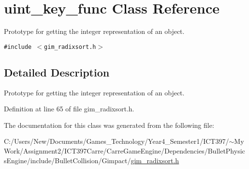 \hypertarget{classuint__key__func}{
\section{uint\_\-key\_\-func Class Reference}
\label{classuint__key__func}
}
Prototype for getting the integer representation of an object.  


{\tt \#include $<$gim\_\-radixsort.h$>$}



\subsection{Detailed Description}
Prototype for getting the integer representation of an object. 

Definition at line 65 of file gim\_\-radixsort.h.

The documentation for this class was generated from the following file:\begin{CompactItemize}
\item 
C:/Users/New/Documents/Games\_\-Technology/Year4\_\-Semester1/ICT397/$\sim$My Work/Assignment2/ICT397Carre/CarreGameEngine/Dependencies/BulletPhysicsEngine/include/BulletCollision/Gimpact/\hyperlink{gim__radixsort_8h}{gim\_\-radixsort.h}\end{CompactItemize}
